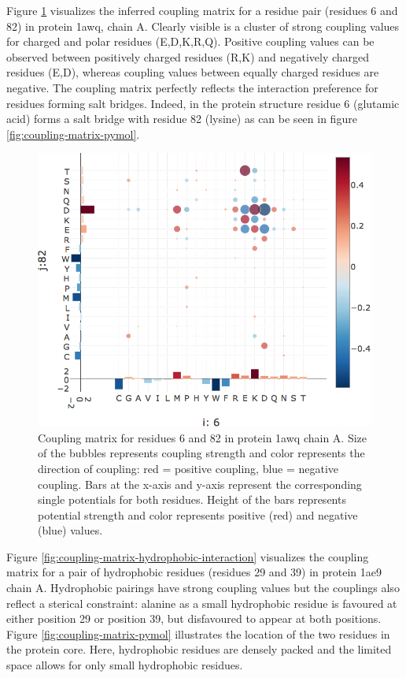 \documentclass[12pt,a4paper,twoside]{book}
\theoremstyle{definition}
\theoremstyle{definition}
\theoremstyle{remark}
\begin{document}
Figure \ref{fig:coupling-matrix-ionic-interaction} visualizes the
inferred coupling matrix for a residue pair (residues 6 and 82) in
protein 1awq, chain A. Clearly visible is a cluster of strong coupling
values for charged and polar residues (E,D,K,R,Q). Positive coupling
values can be observed between positively charged residues (R,K) and
negatively charged residues (E,D), whereas coupling values between
equally charged residues are negative. The coupling matrix perfectly
reflects the interaction preference for residues forming salt bridges.
Indeed, in the protein structure residue 6 (glutamic acid) forms a salt
bridge with residue 82 (lysine) as can be seen in figure
\ref{fig:coupling-matrix-pymol}.









\begin{figure}
\includegraphics[width=0.9\linewidth]{img/coupling_matrix_analysis/coupling_matrix_1a9xA05_6_82_notitle} \caption{Coupling matrix for
residues 6 and 82 in protein 1awq chain A. Size of the bubbles
represents coupling strength and color represents the direction of
coupling: red = positive coupling, blue = negative coupling. Bars at the
x-axis and y-axis represent the corresponding single potentials for both
residues. Height of the bars represents potential strength and color
represents positive (red) and negative (blue) values.}\label{fig:coupling-matrix-ionic-interaction}
\end{figure}

Figure \ref{fig:coupling-matrix-hydrophobic-interaction} visualizes the
coupling matrix for a pair of hydrophobic residues (residues 29 and 39)
in protein 1ae9 chain A. Hydrophobic pairings have strong coupling
values but the couplings also reflect a sterical constraint: alanine as
a small hydrophobic residue is favoured at either position 29 or
position 39, but disfavoured to appear at both positions. Figure
\ref{fig:coupling-matrix-pymol} illustrates the location of the two
residues in the protein core. Here, hydrophobic residues are densely
packed and the limited space allows for only small hydrophobic residues.
\end{document}
